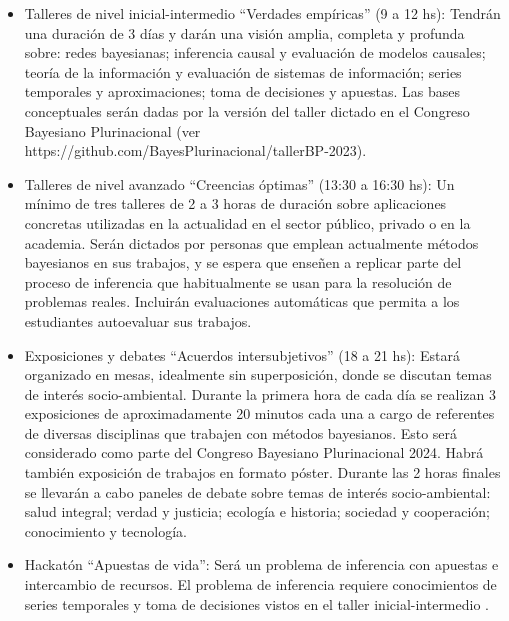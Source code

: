 \documentclass[a4paper,11pt]{book}
\theoremstyle{definition}
\begin{document}

\begin{itemize}
 \item Talleres de nivel inicial-intermedio ``Verdades emp\'iricas'' (9 a 12 hs): Tendr\'an una duraci\'on de 3 d\'ias y dar\'an una visi\'on amplia, completa y profunda sobre: redes bayesianas; inferencia causal y evaluaci\'on de modelos causales; teor\'ia de la informaci\'on y evaluaci\'on de sistemas de informaci\'on; series temporales y aproximaciones; toma de decisiones y apuestas. Las bases conceptuales ser\'an dadas por la versi\'on del taller dictado en el Congreso Bayesiano Plurinacional (ver https://github.com/BayesPlurinacional/tallerBP-2023).

 \item Talleres de nivel avanzado ``Creencias \'optimas'' (13:30 a 16:30 hs): Un m\'inimo de tres talleres de 2 a 3 horas de duraci\'on sobre aplicaciones concretas utilizadas en la actualidad en el sector p\'ublico, privado o en la academia. Ser\'an dictados por personas que emplean actualmente m\'etodos bayesianos en sus trabajos, y se espera que ense\~nen a replicar parte del proceso de inferencia que habitualmente se usan para la resoluci\'on de problemas reales. Incluir\'an evaluaciones autom\'aticas que permita a los estudiantes autoevaluar sus trabajos.

 \item Exposiciones y debates ``Acuerdos intersubjetivos'' (18 a 21 hs):  Estar\'a organizado en mesas, idealmente sin superposici\'on, donde se discutan temas de inter\'es socio-ambiental. Durante la primera hora de cada d\'ia se realizan 3 exposiciones de aproximadamente 20 minutos cada una a cargo de referentes de diversas disciplinas que trabajen con m\'etodos bayesianos. Esto ser\'a considerado como parte del Congreso Bayesiano Plurinacional 2024. Habr\'a tambi\'en exposici\'on de trabajos en formato p\'oster. Durante las 2 horas finales se llevar\'an a cabo paneles de debate sobre temas de inter\'es socio-ambiental: salud integral; verdad y justicia; ecolog\'ia e historia; sociedad y cooperaci\'on; conocimiento y tecnolog\'ia.

 \item Hackat\'on ``Apuestas de vida'': Ser\'a un problema de inferencia con apuestas e intercambio de recursos. El problema de inferencia requiere conocimientos de series temporales y toma de decisiones vistos en el taller inicial-intermedio .
\end{itemize}
\end{document}
